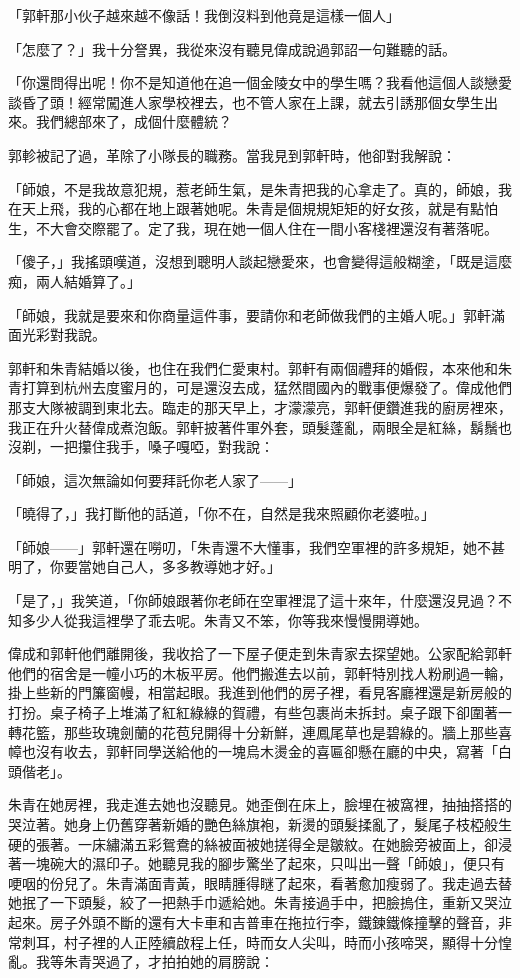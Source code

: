 \documentclass[b5paper,11pt,twoside,twocolumn]{ctexbook}
\begin{document}
「郭軒那小伙子越來越不像話！我倒沒料到他竟是這樣一個人」

「怎麼了？」我十分詧異，我從來沒有聽見偉成說過郭詔一句難聽的話。

「你還問得出呢！你不是知道他在追一個金陵女中的學生嗎？我看他這個人談戀愛談昏了頭！經常闖進人家學校裡去，也不管人家在上課，就去引誘那個女學生出來。我們總部來了，成個什麼體統？

郭軫被記了過，革除了小隊長的職務。當我見到郭軒時，他卻對我解說：

「師娘，不是我故意犯規，惹老師生氣，是朱青把我的心拿走了。真的，師娘，我在天上飛，我的心都在地上跟著她呢。朱青是個規規矩矩的好女孩，就是有點怕生，不大會交際罷了。定了我，現在她一個人住在一間小客棧裡還沒有著落呢。

「傻子，」我搖頭嘆道，沒想到聰明人談起戀愛來，也會變得這般糊塗，「既是這麼痴，兩人結婚算了。」

「師娘，我就是要來和你商量這件事，要請你和老師做我們的主婚人呢。」郭軒滿面光彩對我說。

郭軒和朱青結婚以後，也住在我們仁愛東村。郭軒有兩個禮拜的婚假，本來他和朱青打算到杭州去度蜜月的，可是還沒去成，猛然間國內的戰事便爆發了。偉成他們那支大隊被調到東北去。臨走的那天早上，才濛濛亮，郭軒便鑽進我的廚房裡來，我正在升火替偉成煮泡飯。郭軒披著件軍外套，頭髮蓬亂，兩眼全是紅絲，鬍鬚也沒剃，一把攥住我手，嗓子嘎啞，對我說：

「師娘，這次無論如何要拜託你老人家了——」

「曉得了，」我打斷他的話道，「你不在，自然是我來照顧你老婆啦。」

「師娘——」郭軒還在嘮叨，「朱青還不大懂事，我們空軍裡的許多規矩，她不甚明了，你要當她自己人，多多教導她才好。」

「是了，」我笑道，「你師娘跟著你老師在空軍裡混了這十來年，什麼還沒見過？不知多少人從我這裡學了乖去呢。朱青又不笨，你等我來慢慢開導她。


偉成和郭軒他們離開後，我收拾了一下屋子便走到朱青家去探望她。公家配給郭軒他們的宿舍是一幢小巧的木板平房。他們搬進去以前，郭軒特別找人粉刷過一輪，掛上些新的門簾窗幔，相當起眼。我進到他們的房子裡，看見客廳裡還是新房般的打扮。桌子椅子上堆滿了紅紅綠綠的賀禮，有些包裹尚未拆封。桌子跟下卻圍著一轉花籃，那些玫瑰劍蘭的花苞兒開得十分新鮮，連鳳尾草也是碧綠的。牆上那些喜幛也沒有收去，郭軒同學送給他的一塊烏木燙金的喜匾卻懸在廳的中央，寫著「白頭偕老」。

朱青在她房裡，我走進去她也沒聽見。她歪倒在床上，臉埋在被窩裡，抽抽搭搭的哭泣著。她身上仍舊穿著新婚的艷色絲旗袍，新燙的頭髮揉亂了，髮尾子枝椏般生硬的張著。一床繡滿五彩鴛鴦的絲被面被她搓得全是皺紋。在她臉旁被面上，卻浸著一塊碗大的濕印子。她聽見我的腳步驚坐了起來，只叫出一聲「師娘」，便只有哽咽的份兒了。朱青滿面青黃，眼睛腫得瞇了起來，看著愈加瘦弱了。我走過去替她抿了一下頭髮，絞了一把熱手巾遞給她。朱青接過手中，把臉摀住，重新又哭泣起來。房子外頭不斷的還有大卡車和吉普車在拖拉行李，鐵鍊鐵條撞擊的聲音，非常刺耳，村子裡的人正陸續啟程上任，時而女人尖叫，時而小孩啼哭，顯得十分惶亂。我等朱青哭過了，才拍拍她的肩膀說：
\end{document}
